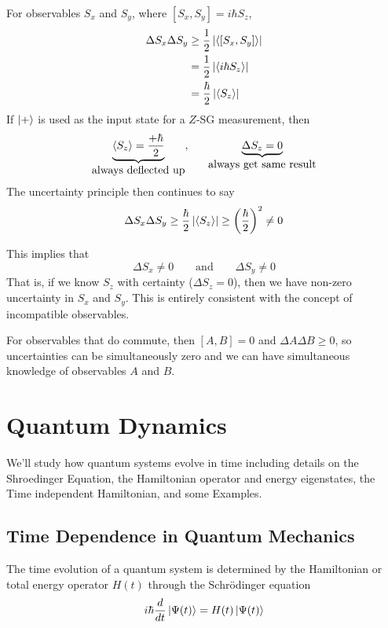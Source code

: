 \documentclass[english, 11pt]{article}
\begin{document}
      \begin{exmp}
        For observables $S_x$ and $S_y$, where $[S_x,S_y] = i\hbar S_z$,
        \begin{align*}
          \Delta S_x \Delta S_y & \geq \frac{1}{2} \left| \langle [S_x,S_y] \rangle \right| \\
                                & = \frac{1}{2} \left| \langle i\hbar S_z \rangle \right| \\
                                & = \frac{\hbar}{2} \left| \langle S_z \rangle \right| \\
        \end{align*}
        If $\left|+\right\rangle$ is used as the input state for a $Z$-SG measurement, then
        \[ \underbrace{\E{S_z} = \f{+\hbar}{2}}_{\mbox{always deflected up}}, \ \ \ \ \ \underbrace{\Delta S_z = 0}_{\mbox{always get same result}} \]
        The uncertainty principle then continues to say
        \[  \Delta S_x \Delta S_y \geq \frac{\hbar}{2} \left| \langle S_z \rangle \right| \geq \left( \frac{\hbar}{2} \right)^2 \not = 0 \]

        This implies that
        \[ \Delta S_x \not = 0 \ \ \ \ \ \ \ \ \ \mbox{and} \ \ \ \ \ \ \ \ \ \Delta S_y \not = 0 \]
        That is, if we know $S_z$ with certainty ($\Delta S_z = 0$), then we have non-zero uncertainty in $S_x$ and $S_y$. This is entirely consistent with the concept of incompatible observables. \newline

        For observables that do commute, then $[A,B] = 0$ and $\Delta A \Delta B \geq 0$, so uncertainties can be simultaneously zero and we can have simultaneous knowledge of observables $A$ and $B$.

      \end{exmp}

  \section{Quantum Dynamics}

    We'll study how quantum systems evolve in time including details on the Shroedinger Equation, the Hamiltonian operator and energy eigenstates, the Time independent Hamiltonian, and some Examples.

    \subsection{Time Dependence in Quantum Mechanics}

    \begin{defn}[Postulate 6]\label{postulate_6}
      The time evolution of a quantum system is determined by the Hamiltonian or total energy operator $H(t)$ through the Schrödinger equation
      \[ i\hbar\frac{d}{dt} \left|\Psi(t)\right\rangle = H(t)\left|\Psi(t)\right\rangle \]
    \end{defn}
\end{document}
